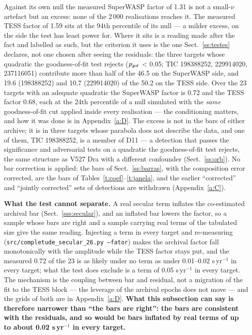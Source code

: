 \documentclass{aa}
\begin{document}
Against its own null the measured SuperWASP factor of 1.31 is not a small-$\nu$ artefact but an excess: none of the 2\,000 realisations reaches it. The measured TESS factor of 1.59 sits at the 94th percentile of its null --- a milder excess, on the side the test has least power for. Where it sits is a reading made after the fact and labelled as such, but the criterion it uses is the one Sect.~\ref{ss:testes} declares, not one chosen after seeing the residuals: the three targets whose quadratic the goodness-of-fit test rejects ($p_{\rm gof}$ < 0.05; TIC 198388252, 229914020, 237116051) contribute more than half of the 46.5 on the SuperWASP side, and 19.6 (198388252) and 10.7 (229914020) of the 50.2 on the TESS side. Over the 23 targets with an adequate quadratic the SuperWASP factor is 0.72 and the TESS factor 0.68, each at the 24th percentile of a null simulated with the \textit{same} goodness-of-fit cut applied inside every realisation --- the conditioning matters, and how it was done is in Appendix~\ref{a:D}. The excess is not in the bars of either archive; it is in three targets whose parabola does not describe the data, and one of them, TIC 198388252, is a member of D11 --- a detection that passes the significance and adversarial tests on a quadratic the goodness-of-fit test rejects, the same structure as V527 Dra with a different confounder (Sect.~\ref{ss:orb}). No bar correction is applied: the bars of Sect.~\ref{ss:barras}, with the composition error corrected, are the bars of Tables~\ref{t:coef}--\ref{t:janela}, and the earlier ``corrected'' and ``jointly corrected'' sets of detections are withdrawn (Appendix~\ref{a:C}).

\textbf{What the test cannot separate.} A real secular term inflates the co-estimated archival bar (Sect.~\ref{sss:secular}), and an inflated bar lowers the factor, so a sample whose bars are right and a sample carrying real terms of the tabulated size give the same reading. Injecting a term in every target and re-measuring (\texttt{src/\allowbreak completude\_\allowbreak secular\_\allowbreak 26.py --fator}) makes the archival factor fall monotonically with the amplitude while the TESS factor stays put, and the measured 0.72 of the 23 is as likely under no term as under 0.01--0.02 s\,yr$^{-1}$ in every target; what the test does exclude is a term of 0.05 s\,yr$^{-1}$ in every target. The mechanism is the coupling between bar and residual, not a migration of the fit to the TESS block --- the leverage of the archival epochs does not move --- and the grids of both are in Appendix~\ref{a:D}. \textbf{What this subsection can say is therefore narrower than ``the bars are right'': the bars are consistent with the residuals, and so would be bars inflated by real terms of up to about 0.02 s\,yr$^{-1}$ in every target.}
\end{document}
